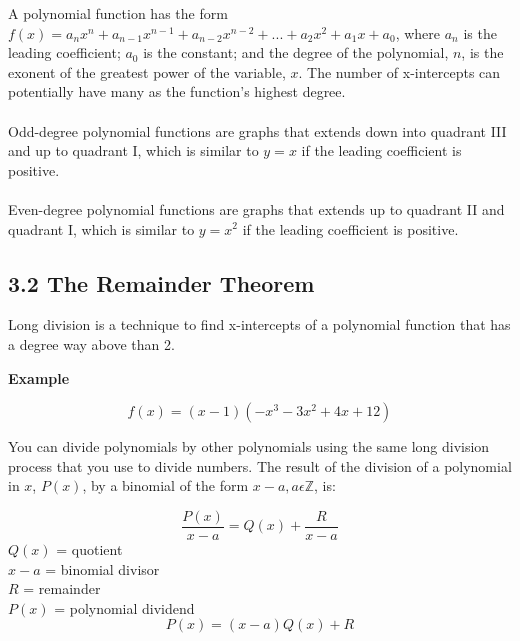 \documentclass[12pt]{article}
\begin{document}
A polynomial function has the form $f(x)=a_n x^n + a_{n-1} x^{n-1} + a_{n-2} x^{n-2} + ... + a_2x^2 + a_1x + a_0$, where $a_n$ is the leading coefficient; $a_0$ is the constant; and the degree of the polynomial, $n$, is the exonent of the greatest power of the variable, $x$. The number of x-intercepts can potentially have many as the function's highest degree. \\
\\
Odd-degree polynomial functions are graphs that extends down into quadrant III and up to quadrant I, which is similar to $y=x$ if the leading coefficient is positive. \\
\\
Even-degree polynomial functions are graphs that extends up to quadrant II and quadrant I, which is similar to $y=x^2$ if the leading coefficient is positive.

\subsection*{3.2 The Remainder Theorem}

Long division is a technique to find x-intercepts of a polynomial function that has a degree way above than 2.

\begin{tcolorbox}
	\textbf{Example}
	\begin{center}
	\end{center}
	\begin{equation*}
		f(x)=(x-1)(-x^3-3x^2+4x+12)
	\end{equation*}
\end{tcolorbox}

You can divide polynomials by other polynomials using the same long division process that you use to divide numbers. The result of the division of a polynomial in $x$, $P(x)$, by a binomial of the form $x - a, a\epsilon \mathbb{Z}$, is: \\

\begin{tcolorbox}
	\begin{equation*}
		\frac{P(x)}{x-a}= Q(x) + \frac{R}{x-a}
	\end{equation*}
$Q(x)$ = quotient \\
$x - a$ = binomial divisor \\
$R$ = remainder \\
$P(x)$ = polynomial dividend 
	\begin{equation*}
		P(x)=(x-a)Q(x)+R
	\end{equation*}
\end{tcolorbox}
\end{document}

